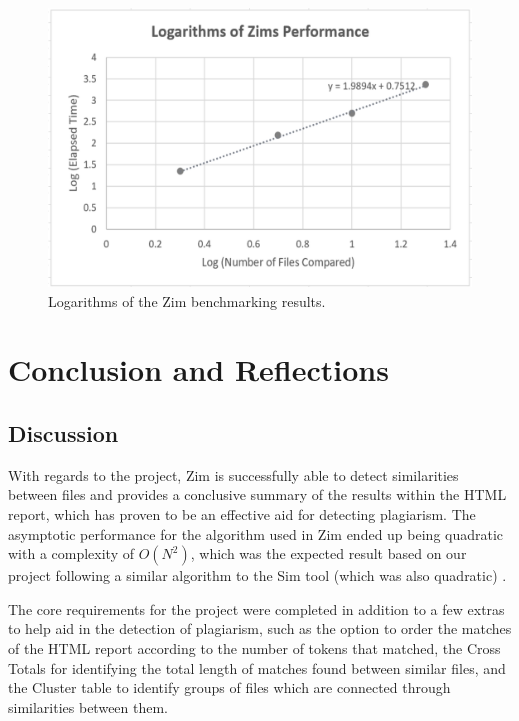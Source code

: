 \documentclass[11pt, a4paper]{article}
\begin{document}
\begin{figure}
\begin{center}
\includegraphics[scale=0.42]{ZimLog}
\end{center}
\caption{\label{fig:log}Logarithms of the Zim benchmarking results.}
\end{figure}

\section{Conclusion and Reflections}

\subsection{Discussion}
With regards to the project, Zim is successfully able to detect similarities between files and provides a conclusive summary of the results within the HTML report, which has proven to be an effective aid for detecting plagiarism. The asymptotic performance for the algorithm used in Zim ended up being quadratic with a complexity of \begin{math}O(N^2)\end{math}, which was the expected result based on our project following a similar algorithm to the Sim tool (which was also quadratic) \cite{techReport}. 

The core requirements for the project were completed in addition to a few extras to help aid in the detection of plagiarism, such as the option to order the matches of the HTML report according to the number of tokens that matched, the Cross Totals for identifying the total length of matches found between similar files, and the Cluster table to identify groups of files which are connected through similarities between them. 
\end{document}
